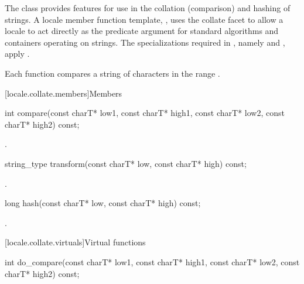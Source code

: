\pnum
The class
provides features for use in the
collation (comparison) and hashing of strings.
A locale member function template,
,
uses the collate facet to allow a locale to act directly as the predicate
argument for standard algorithms and containers operating on strings.
The specializations required in , namely
and
,
apply .

\pnum
Each function compares a string of characters
in the range
.

[locale.collate.members]{Members}

%
\begin{itemdecl}
int compare(const charT* low1, const charT* high1,
            const charT* low2, const charT* high2) const;
\end{itemdecl}

\begin{itemdescr}
\pnum
\returns
{}.
\end{itemdescr}

%
\begin{itemdecl}
string_type transform(const charT* low, const charT* high) const;
\end{itemdecl}

\begin{itemdescr}
\pnum
\returns
{}.
\end{itemdescr}

%
\begin{itemdecl}
long hash(const charT* low, const charT* high) const;
\end{itemdecl}

\begin{itemdescr}
\pnum
\returns
{}.
\end{itemdescr}

[locale.collate.virtuals]{Virtual functions}

%
\begin{itemdecl}
int do_compare(const charT* low1, const charT* high1,
               const charT* low2, const charT* high2) const;
\end{itemdecl}

